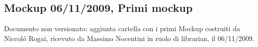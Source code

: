 \subsection{Mockup 06/11/2009, Primi mockup}
Documento non versionato: aggiunta cartella con i primi Mockup costruiti da
Niccol\'o Rogai, ricevuto da Massimo Nocentini in ruolo di librarian, il
06/11/2009.
